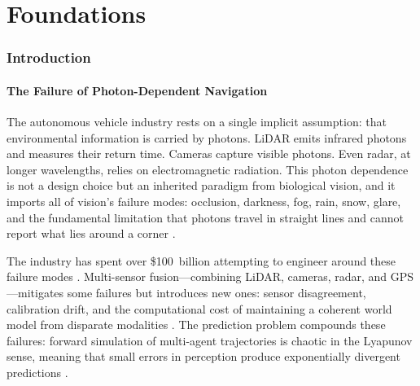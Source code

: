 \documentclass[11pt,twocolumn,a4paper]{article}
\theoremstyle{plain}
\theoremstyle{definition}
\theoremstyle{remark}
\begin{document}

\part{Foundations}
\label{part:foundations}

\section{Introduction}
\label{sec:introduction}

\subsection{The Failure of Photon-Dependent Navigation}

The autonomous vehicle industry rests on a single implicit assumption: that environmental information is carried by photons. LiDAR emits infrared photons and measures their return time. Cameras capture visible photons. Even radar, at longer wavelengths, relies on electromagnetic radiation. This photon dependence is not a design choice but an inherited paradigm from biological vision, and it imports all of vision's failure modes: occlusion, darkness, fog, rain, snow, glare, and the fundamental limitation that photons travel in straight lines and cannot report what lies around a corner \cite{thrun2006stanley, schwarting2018planning, kaplan2017understanding}.

The industry has spent over \$100~billion attempting to engineer around these failure modes \cite{bojarski2016end}. Multi-sensor fusion---combining LiDAR, cameras, radar, and GPS---mitigates some failures but introduces new ones: sensor disagreement, calibration drift, and the computational cost of maintaining a coherent world model from disparate modalities \cite{urmson2008autonomous}. The prediction problem compounds these failures: forward simulation of multi-agent trajectories is chaotic in the Lyapunov sense, meaning that small errors in perception produce exponentially divergent predictions \cite{lorenz1963deterministic, helbing2001traffic}.
\end{document}
